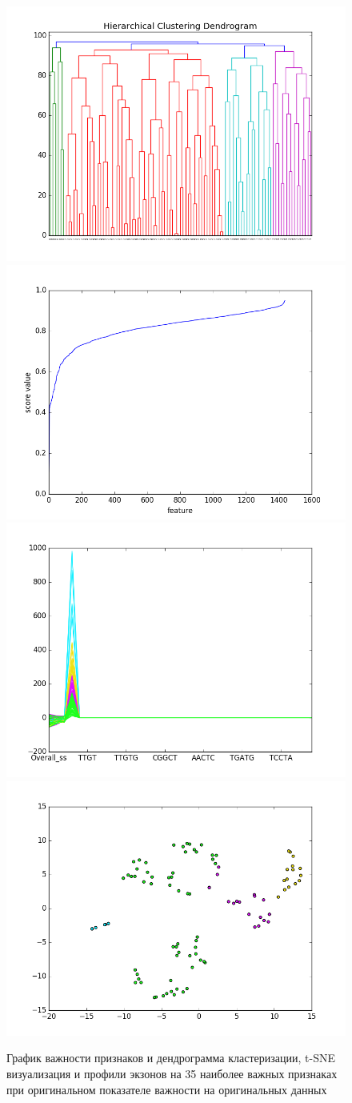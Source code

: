 \begin{figure}[H]
	\includegraphics[width=0.5\linewidth]{pics/dendrograms/lp_unnorm_cosine.png}
	\includegraphics[width=0.5\linewidth]{pics/graphs/lp_unnorm_cosine.png}
	\includegraphics[width=0.5\linewidth]{pics/profiles/lp_unnorm_cosine.png}
	\includegraphics[width=0.5\linewidth]{pics/tsne/lp_unnorm_cosine.png}
	\caption{График важности признаков и дендрограмма кластеризации, t-SNE визуализация и профили экзонов на 35 наиболее важных признаках при оригинальном показателе важности на оригинальных данных}
	\label{lp_unnorm_cosine}
\end{figure}

